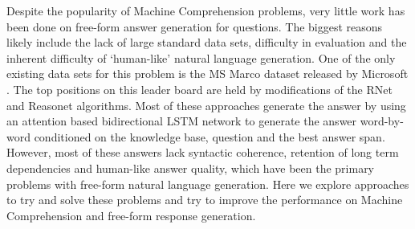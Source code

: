Despite the popularity of Machine Comprehension problems, very little work has been done on free-form answer generation for questions. The biggest reasons likely include the lack of large standard data sets, difficulty in evaluation and the inherent difficulty of `human-like' natural language generation. One of the only existing data sets for this problem is the MS Marco dataset released by Microsoft \cite{msmarco}. The top positions on this leader board are held by modifications of the RNet \cite{Rnet} and Reasonet \cite{Reasonet} algorithms. Most of these approaches generate the answer by using an attention based bidirectional LSTM network to generate the answer word-by-word conditioned on the knowledge base, question and the best answer span. However, most of these answers lack syntactic coherence, retention of long term dependencies and human-like answer quality, which have been the primary problems with free-form natural language generation. Here we explore approaches to try and solve these problems and try to improve the performance on Machine Comprehension and free-form response generation.\\
